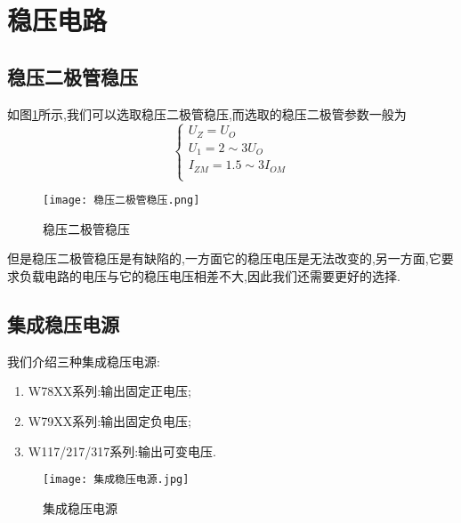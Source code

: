 \section{\K 稳压电路}
\subsection{\K 稳压二极管稳压}
\Par 如图\ref{fig:稳压二极管稳压}所示,我们可以选取稳压二极管稳压,而选取的稳压二极管参数一般为
\begin{equation*}
    \begin{cases}
        U_Z=U_O\\
        U_1=2\sim 3U_O\\
        I_{ZM}=1.5\sim 3I_{OM}\\
    \end{cases}
\end{equation*}

\begin{figure}[htbp]
	\centering
	\texttt{[image: 稳压二极管稳压.png]}
	\caption{稳压二极管稳压}
	\label{fig:稳压二极管稳压}
\end{figure}

但是稳压二极管稳压是有缺陷的,一方面它的稳压电压是无法改变的,另一方面,它要求负载电路的电压与它的稳压电压相差不大,因此我们还需要更好的选择.

\subsection{\K 集成稳压电源}
\Par 我们介绍三种集成稳压电源:
\begin{enumerate}[ ]
    \item W78XX系列:输出固定正电压;
    \item W79XX系列:输出固定负电压;
    \item W117/217/317系列:输出可变电压.
\end{enumerate}
\begin{figure}[htbp]
	\centering
	\texttt{[image: 集成稳压电源.jpg]}
	\caption{集成稳压电源}
	\label{fig:集成稳压电源}
\end{figure}


